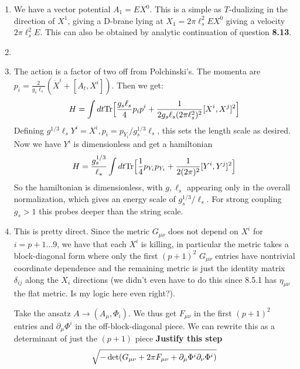 \documentclass[11pt, class=article, crop=false]{standalone}
\begin{document}
\begin{enumerate}
	\item We have a vector potential $A_1 = E X^0$. This is a simple as $T$-dualizing in the direction of $X^1$, giving a D-brane lying at $X_1 = 2 \pi \ell_s^2 E X^0$ giving a velocity $2 \pi \ell_s^2 E$. This can also be obtained by analytic continuation of question \textbf{8.13}. 
	
	\item 
	
	\item The action is a factor of two off from Polchinski's. The momenta are $p_i = \frac{2}{g_s \ell_s} (\dot X^i + [A_t, X^i])$. Then we get:
	\[
		H = \int dt \mathrm{Tr}\Big[\frac{g_s \ell_s}{4} p_i p^i + \frac{1}{2 g_s \ell_s (2\pi \ell_s^2)^2} [X^i, X^j]^2\Big]
	\]
	Defining $g^{1/3} \ell_s Y^i = X^i, p_i = p_{Y_i}/g_s^{1/3} \ell_s$, this sets the length scale as desired. Now we have $Y^i$ is dimensionless and get a hamiltonian
	\[
		H = \frac{g_s^{1/3}}{\ell_s} \int dt \mathrm{Tr}\Big[\frac14 p_{Y_i} p_{Y_i} + \frac{1}{2 (2\pi )^2} [Y^i, Y^j]^2\Big]
	\]
	So the hamiltonian is dimensionless, with $g, \ell_s$ appearing only in the overall normalization, which gives an energy scale of $g_s^{1/3}/\ell_s$. For strong coupling $g_s > 1$ this probes deeper than the string scale. 
	
	\item This is pretty direct. Since the metric $G_{\mu \nu}$ does not depend on $X^i$ for $i=p+1 \dots 9$, we have that each $X^i$ is killing, in particular the metric takes a block-diagonal form where only the first $(p+1)^2$ $G_{\mu \nu}$ entries have nontrivial coordinate dependence and the remaining metric is just the identity matrix $\delta_{ij}$ along the $X_i$ directions (we didn't even have to do this since 8.5.1 has $\eta_{\mu \nu}$ the flat metric. Is my logic here even right?). 
	
	Take the ansatz $A \to (A_\mu, \Phi_i)$. We thus get $F_{\mu \nu}$ in the first $(p+1)^2$ entries and $\partial_\mu \Phi^i$ in the off-block-diagonal piece. We can rewrite this as a determinant of just the $(p+1)$ piece \textbf{Justify this step}
	\[
		\sqrt{-\det(G_{\mu \nu} + 2 \pi F_{\mu \nu} + \partial_\mu \Phi^i \partial_\nu \Phi^i)}
	\]
	

\end{enumerate}
\end{document}
